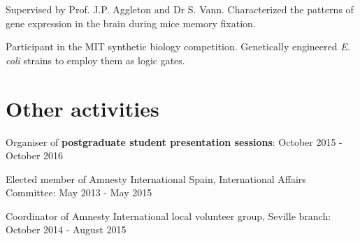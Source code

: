 \documentclass[letterpaper]{deedy-resume}
\begin{document}
\begin{minipage}[t]{0.99\textwidth}
	
	Supervised by Prof. J.P. Aggleton and Dr S. Vann. Characterized the patterns of gene expression in the brain during mice memory fixation.\\
	\smallsectionspace
	
	
	Participant in the MIT synthetic biology competition. Genetically engineered \textit{E. coli} strains to employ them as logic gates.
	\sectionspace 


\section{Other activities}

 \textbullet{} Organiser of \textbf{postgraduate student presentation sessions}: October 2015 - October 2016
 
  \textbullet{} Elected member of Amnesty International Spain, International Affairs Committee: May 2013 - May 2015
  
  \textbullet{} Coordinator of Amnesty International local volunteer group, Seville branch: October 2014 - August 2015
 
\sectionspace 
\end{minipage} 
\end{document}
